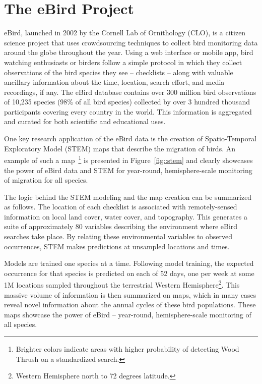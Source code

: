 \documentclass{acm_proc_article-sp}
\begin{document}
\section{The eBird Project}\label{sec::ebird}
eBird, launched in 2002 by the Cornell Lab of Ornithology (CLO), is a citizen science project that uses crowdsourcing techniques to collect bird monitoring data around the globe throughout the year. Using a web interface or mobile app, bird watching enthusiasts or birders follow a simple protocol in which they collect observations of the bird species they see -- checklists -- along with valuable ancillary information about the time, location, search effort, and media recordings, if any. The eBird database contains over 300 million bird observations of 10,235 species (98\% of all bird species) collected by over 3 hundred thousand participants covering every country in the world. This information is aggregated and curated for both scientific and educational uses.

One key research application of the eBird data is the creation of Spatio-Temporal Exploratory Model (STEM) maps that describe the migration of birds. An example of such a map~\footnote{Brighter colors indicate areas with higher probability of detecting Wood Thrush on a standardized search.} is presented in Figure~\ref{fig::stem} and clearly showcases the power of eBird data and STEM for year-round, hemisphere-scale monitoring of migration for all species.

The logic behind the STEM modeling and the map creation can be summarized as follows. The location of each checklist is associated with remotely-sensed information on local land cover, water cover, and topography. This generates a suite of approximately 80 variables describing the environment where eBird searches take place. By relating these environmental variables to observed occurrences, STEM makes predictions at unsampled locations and times. 

Models are trained one species at a time. Following model training, the expected occurrence for that species is predicted on each of 52 days, one per week at some 1M locations sampled throughout the terrestrial Western Hemisphere\footnote{Western Hemisphere north to 72 degrees latitude.}. This massive volume of information is then summarized on maps, which in many cases reveal novel information about the annual cycles of these bird populations. These maps showcase the power of eBird -- year-round, hemisphere-scale monitoring of all species.
\end{document}
